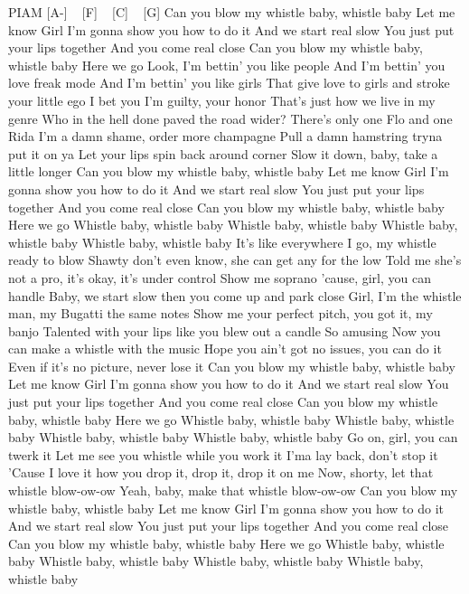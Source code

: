 
PIAM
[A-] ~ [F] ~ [C] ~ [G]
Can you blow my whistle baby, whistle baby
Let me know
Girl I'm gonna show you how to do it
And we start real slow
You just put your lips together
And you come real close
Can you blow my whistle baby, whistle baby
Here we go
Look, I'm bettin' you like people
And I'm bettin' you love freak mode
And I'm bettin' you like girls
That give love to girls and stroke your little ego
I bet you I'm guilty, your honor
That's just how we live in my genre
Who in the hell done paved the road wider?
There's only one Flo and one Rida
I'm a damn shame, order more champagne
Pull a damn hamstring tryna put it on ya
Let your lips spin back around corner
Slow it down, baby, take a little longer
Can you blow my whistle baby, whistle baby
Let me know
Girl I'm gonna show you how to do it
And we start real slow
You just put your lips together
And you come real close
Can you blow my whistle baby, whistle baby
Here we go
Whistle baby, whistle baby
Whistle baby, whistle baby
Whistle baby, whistle baby
Whistle baby, whistle baby
It's like everywhere I go, my whistle ready to blow
Shawty don't even know, she can get any for the low
Told me she's not a pro, it's okay, it's under control
Show me soprano 'cause, girl, you can handle
Baby, we start slow then you come up and park close
Girl, I'm the whistle man, my Bugatti the same notes
Show me your perfect pitch, you got it, my banjo
Talented with your lips like you blew out a candle
So amusing
Now you can make a whistle with the music
Hope you ain't got no issues, you can do it
Even if it's no picture, never lose it
Can you blow my whistle baby, whistle baby
Let me know
Girl I'm gonna show you how to do it
And we start real slow
You just put your lips together
And you come real close
Can you blow my whistle baby, whistle baby
Here we go
Whistle baby, whistle baby
Whistle baby, whistle baby
Whistle baby, whistle baby
Whistle baby, whistle baby
Go on, girl, you can twerk it
Let me see you whistle while you work it
I'ma lay back, don't stop it
'Cause I love it how you drop it, drop it, drop it on me
Now, shorty, let that whistle blow-ow-ow
Yeah, baby, make that whistle blow-ow-ow
Can you blow my whistle baby, whistle baby
Let me know
Girl I'm gonna show you how to do it
And we start real slow
You just put your lips together
And you come real close
Can you blow my whistle baby, whistle baby
Here we go
Whistle baby, whistle baby
Whistle baby, whistle baby
Whistle baby, whistle baby
Whistle baby, whistle baby